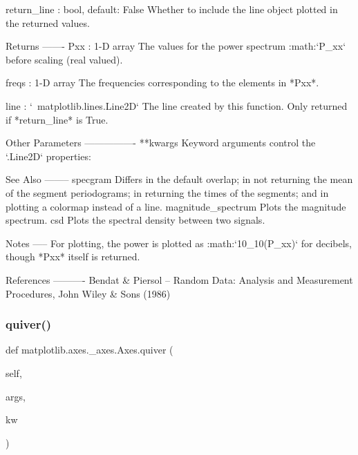 \begin{DoxyVerb}
\begin{DoxyVerb}
return_line : bool, default: False
    Whether to include the line object plotted in the returned values.

Returns
-------
Pxx : 1-D array
    The values for the power spectrum :math:`P_{xx}` before scaling
    (real valued).

freqs : 1-D array
    The frequencies corresponding to the elements in *Pxx*.

line : `~matplotlib.lines.Line2D`
    The line created by this function.
    Only returned if *return_line* is True.

Other Parameters
----------------
**kwargs
    Keyword arguments control the `.Line2D` properties:


See Also
--------
specgram
    Differs in the default overlap; in not returning the mean of the
    segment periodograms; in returning the times of the segments; and
    in plotting a colormap instead of a line.
magnitude_spectrum
    Plots the magnitude spectrum.
csd
    Plots the spectral density between two signals.

Notes
-----
For plotting, the power is plotted as
:math:`10\log_{10}(P_{xx})` for decibels, though *Pxx* itself
is returned.

References
----------
Bendat & Piersol -- Random Data: Analysis and Measurement Procedures,
John Wiley & Sons (1986)
\end{DoxyVerb}
 \mbox{\label{classmatplotlib_1_1axes_1_1__axes_1_1Axes_ae148559322ca3daf3b5e066a78e3130d}} 
\subsubsection{\texorpdfstring{quiver()}{quiver()}}
{\footnotesize\ttfamily def matplotlib.\+axes.\+\_\+axes.\+Axes.\+quiver (\begin{DoxyParamCaption}\item[{}]{self,  }\item[{}]{args,  }\item[{}]{kw }\end{DoxyParamCaption})}

\mbox{\label{classmatplotlib_1_1axes_1_1__axes_1_1Axes_af0c003ef885208c0dadf023810242860}} 

\end{DoxyVerb}
